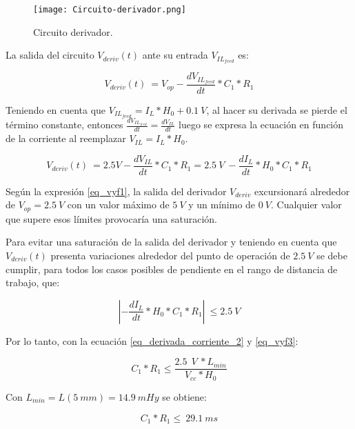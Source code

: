 \begin{figure}[H]
	\centering
	\texttt{[image: Circuito-derivador.png]}
	\caption{Circuito derivador.}
	\label{fig:img_Circuito-derivador}
\end{figure}


La salida del circuito $V_{deriv}(t)$ ante su entrada $V_{IL_{feed}}$ es:

\begin{equation} 
	V_{deriv}(t)\ = V_{op} - \frac{dV_{IL_{feed}}}{dt}*C_1*R_1
\end{equation}

Teniendo en cuenta que $V_{IL_{feed}}=I_L*H_0+0.1\:V$, al hacer su derivada se pierde el término constante, entonces $ \frac{dV_{IL_{feed}}}{dt}= \frac{dV_{IL}}{dt}$ luego se expresa la ecuación en función de la corriente al reemplazar $V_{IL}=I_L*H_0$.

\begin{equation} \label{eq_vyf1}
	V_{deriv}(t)\ = 2.5V - \frac{dV_{IL}}{dt}*C_1*R_1 = 2.5\:V\ -\frac{dI_L}{dt}*H_0*C_1*R_1
\end{equation}

Según la expresión \ref{eq_vyf1}, la salida del derivador $V_{deriv}$ excursionará alrededor de $V_{op}=2.5\:V$ con un valor máximo de $5\:V$ y un mínimo de $0\:V$. Cualquier valor que supere esos límites provocaría una saturación.

Para evitar una saturación de la salida del derivador y teniendo en cuenta que $V_{deriv}(t)$ presenta variaciones alrededor del punto de operación de $2.5\:V$ se debe cumplir, para todos los casos posibles de pendiente en el rango de distancia de trabajo, que:

\begin{equation} \label{eq_vyf3}
	\left|-\frac{dI_L}{dt}*H_0*C_1*R_1\right|\ \le 2.5\:V
\end{equation}

Por lo tanto, con la ecuación \ref{eq_derivada_corriente_2} y \ref{eq_vyf3}:

\begin{equation} \label{eq_condicionC1-R1}
	C_1*R_1\le\frac{2.5\ \:V\ *L_{min}}{V_{cc}*H_0}
\end{equation}

Con $L_{min}= L(5\: mm) = 14.9\: mHy$ se obtiene: 

\begin{equation} \label{eq_condicionC1-R1-2}
	C_1*R_1\le\ 29.1\ ms
\end{equation}

